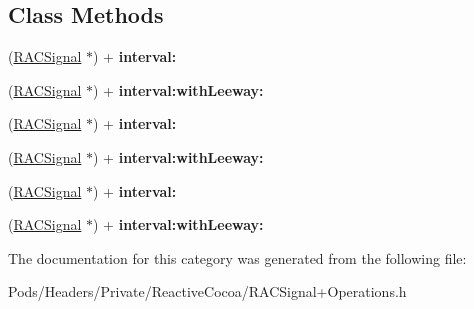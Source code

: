\subsection*{Class Methods}
\begin{DoxyCompactItemize}
\item 
\mbox{\label{category_r_a_c_signal_07_operations_deprecated_08_a49d012fbe985cf33b2085f5abe100087}} 
(\mbox{\hyperlink{interface_r_a_c_signal}{R\+A\+C\+Signal}} $\ast$) + {\bfseries interval\+:}
\item 
\mbox{\label{category_r_a_c_signal_07_operations_deprecated_08_afe09d66e4009b9d7a5f6619e0f5018c0}} 
(\mbox{\hyperlink{interface_r_a_c_signal}{R\+A\+C\+Signal}} $\ast$) + {\bfseries interval\+:with\+Leeway\+:}
\item 
\mbox{\label{category_r_a_c_signal_07_operations_deprecated_08_a49d012fbe985cf33b2085f5abe100087}} 
(\mbox{\hyperlink{interface_r_a_c_signal}{R\+A\+C\+Signal}} $\ast$) + {\bfseries interval\+:}
\item 
\mbox{\label{category_r_a_c_signal_07_operations_deprecated_08_afe09d66e4009b9d7a5f6619e0f5018c0}} 
(\mbox{\hyperlink{interface_r_a_c_signal}{R\+A\+C\+Signal}} $\ast$) + {\bfseries interval\+:with\+Leeway\+:}
\item 
\mbox{\label{category_r_a_c_signal_07_operations_deprecated_08_a49d012fbe985cf33b2085f5abe100087}} 
(\mbox{\hyperlink{interface_r_a_c_signal}{R\+A\+C\+Signal}} $\ast$) + {\bfseries interval\+:}
\item 
\mbox{\label{category_r_a_c_signal_07_operations_deprecated_08_afe09d66e4009b9d7a5f6619e0f5018c0}} 
(\mbox{\hyperlink{interface_r_a_c_signal}{R\+A\+C\+Signal}} $\ast$) + {\bfseries interval\+:with\+Leeway\+:}
\end{DoxyCompactItemize}


The documentation for this category was generated from the following file\+:\begin{DoxyCompactItemize}
\item 
Pods/\+Headers/\+Private/\+Reactive\+Cocoa/R\+A\+C\+Signal+\+Operations.\+h\end{DoxyCompactItemize}
